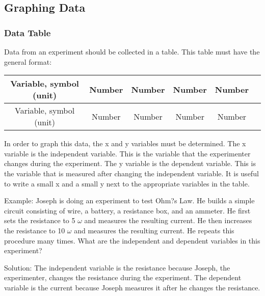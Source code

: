 \subsection{Graphing Data}

\subsubsection{Data Table}

Data from an experiment should be collected in a table. This table must have the general format:

\begin{center}
\begin{tabular}{ | c | c | c | c | c l} \hline
Variable, symbol (unit) & Number & Number & Number & Number \\ \hline
Variable, symbol (unit) & Number & Number & Number & Number \\ \hline
\end{tabular}
\end{center}

In order to graph this data, the x and y variables must be determined. The x variable is the independent variable. This is the variable that the experimenter changes during the experiment. The y variable is the dependent variable. This is the variable that is measured after changing the independent variable.
It is useful to write a small x and a small y next to the appropriate variables in the table. 

Example: Joseph is doing an experiment to test Ohm?s Law. He builds a simple circuit consisting of wire, a battery, a resistance box, and an ammeter. He first sets the resistance to 5 $ \omega$ and measures the resulting current. He then increases the resistance to 10 $\omega$ and measures the resulting current. He repeats this procedure many times.  What are the independent and dependent variables in this experiment?

Solution: The independent variable is the resistance because Joseph, the experimenter, changes the resistance during the experiment. The dependent variable is the current because Joseph measures it after he changes the resistance.

